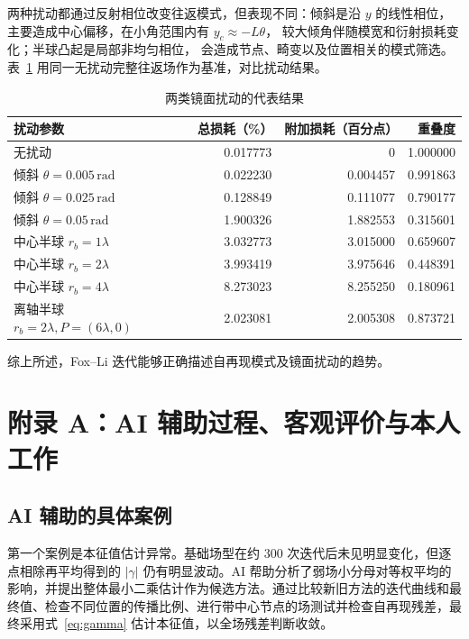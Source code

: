 \documentclass[UTF8,a4paper,12pt]{ctexart}
\begin{document}
两种扰动都通过反射相位改变往返模式，但表现不同：倾斜是沿 \(y\) 的线性相位，
主要造成中心偏移，在小角范围内有 \(y_c\approx-L\theta\)，
较大倾角伴随模宽和衍射损耗变化；半球凸起是局部非均匀相位，
会造成节点、畸变以及位置相关的模式筛选。表~\ref{tab:mirror-comparison}
用同一无扰动完整往返场作为基准，对比扰动结果。

\begin{table}[!htbp]
 \centering\small
 \caption{两类镜面扰动的代表结果}\label{tab:mirror-comparison}
 \begin{tabular}{lrrr}\toprule
 扰动参数 & 总损耗（\%） & 附加损耗（百分点） & 重叠度\\\midrule
 无扰动 & 0.017773 & 0 & 1.000000\\
 倾斜 \(\theta=0.005\,\mathrm{rad}\) & 0.022230 & 0.004457 & 0.991863\\
 倾斜 \(\theta=0.025\,\mathrm{rad}\) & 0.128849 & 0.111077 & 0.790177\\
 倾斜 \(\theta=0.05\,\mathrm{rad}\) & 1.900326 & 1.882553 & 0.315601\\
 中心半球 \(r_b=1\lambda\) & 3.032773 & 3.015000 & 0.659607\\
 中心半球 \(r_b=2\lambda\) & 3.993419 & 3.975646 & 0.448391\\
 中心半球 \(r_b=4\lambda\) & 8.273023 & 8.255250 & 0.180961\\
 离轴半球 \(r_b=2\lambda,P=(6\lambda,0)\) & 2.023081 & 2.005308 & 0.873721\\
 \bottomrule\end{tabular}
\end{table}

综上所述，Fox--Li 迭代能够正确描述自再现模式及镜面扰动的趋势。

\clearpage
\begingroup
{}
\section*{附录 A：AI 辅助过程、客观评价与本人工作}

\subsection*{AI 辅助的具体案例}
第一个案例是本征值估计异常。基础场型在约 300 次迭代后未见明显变化，但逐点相除再平均得到的 \(|\gamma|\) 仍有明显波动。AI 帮助分析了弱场小分母对等权平均的影响，并提出整体最小二乘估计作为候选方法。通过比较新旧方法的迭代曲线和最终值、检查不同位置的传播比例、进行带中心节点的场测试并检查自再现残差，最终采用式~\eqref{eq:gamma} 估计本征值，以全场残差判断收敛。
\end{document}
